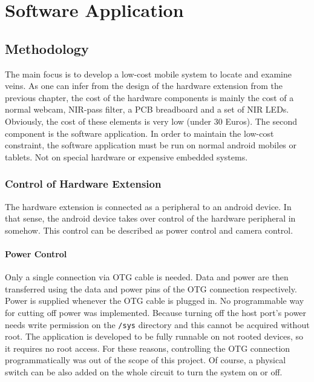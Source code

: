 
\chapter{Software Application}\label{Software Application}

\section{Methodology}
The main focus is to develop a low-cost mobile system to locate and examine veins. As one can infer from the design of the hardware extension from the previous chapter, the cost of the hardware components is mainly the cost of a normal webcam, NIR-pass filter, a PCB breadboard and a set of NIR LEDs. Obviously, the cost of these elements is very low (under 30 Euros). The second component is the software application. In order to maintain the low-cost constraint, the software application must be run on normal android mobiles or tablets. Not on special hardware or expensive embedded systems.

\subsection{Control of Hardware Extension}

The hardware extension is connected as a peripheral to an android device. In that sense, the android device takes over control of the hardware peripheral in somehow. This control can be described as power control and camera control.

\subsubsection{Power Control}
Only a single connection via OTG cable is needed. Data and power are then transferred using the data and power pins of the OTG connection respectively. Power is supplied whenever the OTG cable is plugged in. No programmable way for cutting off power was implemented. Because turning off the host port’s power needs write permission on the \texttt{/sys} directory and this cannot be acquired without root. The application is developed to be fully runnable on not rooted devices, so it requires no root access. For these reasons, controlling the OTG connection programmatically was out of the scope of this project. Of course, a physical switch can be also added on the whole circuit to turn the system on or off. 

